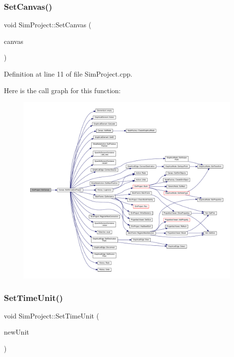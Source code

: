 \subsubsection{\texorpdfstring{Set\+Canvas()}{SetCanvas()}}
{\footnotesize\ttfamily void Sim\+Project\+::\+Set\+Canvas (\begin{DoxyParamCaption}\item[{\hyperlink{class_canvas}{Canvas} $\ast$}]{canvas }\end{DoxyParamCaption})}



Definition at line 11 of file Sim\+Project.\+cpp.

Here is the call graph for this function\+:
\nopagebreak
\begin{figure}[H]
\begin{center}
\leavevmode
\includegraphics[width=350pt]{class_sim_project_aa0e8fbbc7a2307501e31601ac6e9d967_cgraph}
\end{center}
\end{figure}
\mbox{\label{class_sim_project_aa54bb0c929580649657d667f4c19646c}} 
\subsubsection{\texorpdfstring{Set\+Time\+Unit()}{SetTimeUnit()}}
{\footnotesize\ttfamily void Sim\+Project\+::\+Set\+Time\+Unit (\begin{DoxyParamCaption}\item[{\hyperlink{_simulation_executive_8h_add9fe45e09605eee3e4a39c8a5c4476d}{Time\+Unit}}]{new\+Unit }\end{DoxyParamCaption})}



